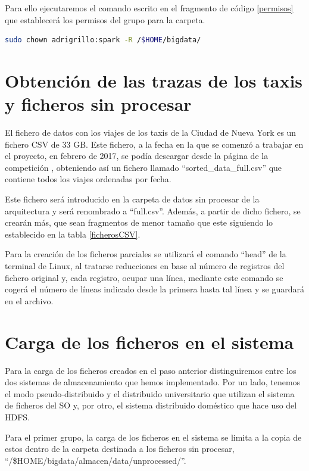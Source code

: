 Para ello ejecutaremos el comando escrito en el fragmento de código \ref{permisos} que establecerá los permisos del grupo para la carpeta.

\begin{lstlisting}[label=permisos,language=sh,frame=single,caption=Comando para establecer permisos de lectura y escritura en el sistema de ficheros de la arquitectura]
sudo chown adrigrillo:spark -R /$HOME/bigdata/
\end{lstlisting}

\section{Obtención de las trazas de los taxis y ficheros sin procesar}
El fichero de datos con los viajes de los taxis de la Ciudad de Nueva York es un fichero \gls{CSV} de 33 \gls{GB}. Este fichero, a la fecha en la que se comenzó a trabajar en el proyecto, en febrero de 2017, se podía descargar desde la página de la competición \cite{grandChallenge}, obteniendo así un fichero llamado ``sorted\_data\_full.csv'' que contiene todos los viajes ordenadas por fecha.

Este fichero será introducido en la carpeta de datos sin procesar de la arquitectura y será renombrado a ``full.csv''. Además, a partir de dicho fichero, se crearán más, que sean fragmentos de menor tamaño que este siguiendo lo establecido en la tabla \ref{ficherosCSV}.

Para la creación de los ficheros parciales se utilizará el comando ``head'' de la terminal de Linux, al tratarse reducciones en base al número de registros del fichero original y, cada registro, ocupar una línea, mediante este comando se cogerá el número de líneas indicado desde la primera hasta tal línea y se guardará en el archivo.

\section{Carga de los ficheros en el sistema}
Para la carga de los ficheros creados en el paso anterior distinguiremos entre los dos sistemas de almacenamiento que hemos implementado. Por un lado, tenemos el modo pseudo-distribuido y el distribuido universitario que utilizan el sistema de ficheros del \gls{SO} y, por otro, el sistema distribuido doméstico que hace uso del \gls{HDFS}.

Para el primer grupo, la carga de los ficheros en el sistema se limita a la copia de estos dentro de la carpeta destinada a los ficheros sin procesar, ``/\$HOME/bigdata/almacen/data/unprocessed/''.

